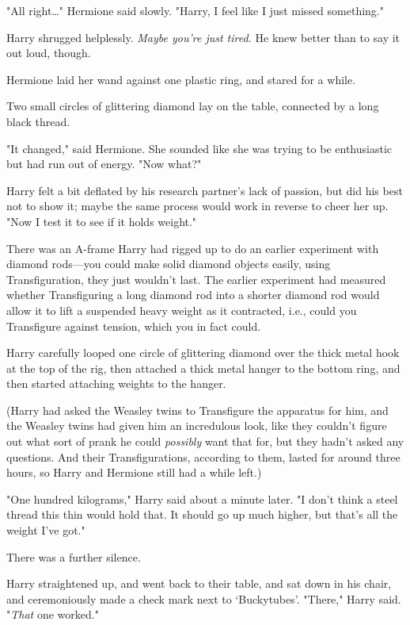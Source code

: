 "All right{\ldots}" Hermione said slowly. "Harry, I feel like I just missed 
something."

Harry shrugged helplessly. \emph{Maybe you're just tired.} He knew better than 
to say it out loud, though.

Hermione laid her wand against one plastic ring, and stared for a while.

Two small circles of glittering diamond lay on the table, connected by a long 
black thread.

"It changed," said Hermione. She sounded like she was trying to be enthusiastic 
but had run out of energy. "Now what?"

Harry felt a bit deflated by his research partner's lack of passion, but did 
his best not to show it; maybe the same process would work in reverse to cheer 
her up. "Now I test it to see if it holds weight."

There was an A-frame Harry had rigged up to do an earlier experiment with 
diamond rods---you could make solid diamond objects easily, using 
Transfiguration, they just wouldn't last. The earlier experiment had measured 
whether Transfiguring a long diamond rod into a shorter diamond rod would allow 
it to lift a suspended heavy weight as it contracted, i.e., could you 
Transfigure against tension, which you in fact could.

Harry carefully looped one circle of glittering diamond over the thick metal 
hook at the top of the rig, then attached a thick metal hanger to the bottom 
ring, and then started attaching weights to the hanger.

(Harry had asked the Weasley twins to Transfigure the apparatus for him, and 
the Weasley twins had given him an incredulous look, like they couldn't figure 
out what sort of prank he could \emph{possibly} want that for, but they hadn't 
asked any questions. And their Transfigurations, according to them, lasted for 
around three hours, so Harry and Hermione still had a while left.)

"One hundred kilograms," Harry said about a minute later. "I don't think a 
steel thread this thin would hold that. It should go up much higher, but that's 
all the weight I've got."

There was a further silence.

Harry straightened up, and went back to their table, and sat down in his chair, 
and ceremoniously made a check mark next to `Buckytubes'. "There," Harry said. 
"\emph{That} one worked."

